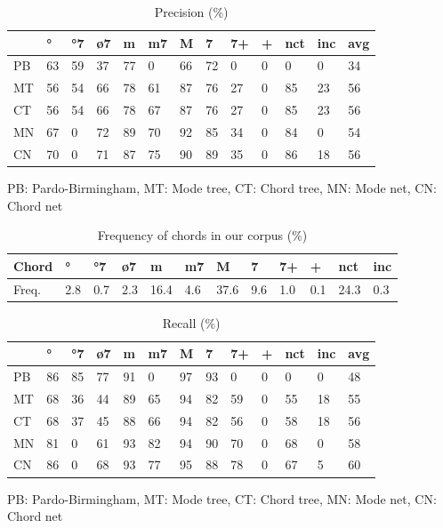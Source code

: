 \documentclass{article}
\begin{document}
\begin{table}
  \centering
  \begin{tabular}{l|p{.1cm}p{.1cm}p{.1cm}p{.1cm}p{.1cm}p{.1cm}p{.1cm}p{.1cm}p{.01cm}p{.1cm}p{.35cm}|p{.3cm}}
                 &  °& °7& ø7& m&  m7&  M&  7& 7+&+&nct&inc& avg\\
    \hline                                                     
    PB   & 63& 59& 37& 77&  0& 66& 72&  0&0&  0&  0& 34 \\
    MT   & 56& 54& 66& 78& 61& 87& 76& 27&0& 85& 23& 56 \\
    CT   & 56& 54& 66& 78& 67& 87& 76& 27&0& 85& 23& 56 \\
    MN   & 67&  0& 72& 89& 70& 92& 85& 34&0& 84&  0& 54 \\
    CN   & 70&  0& 71& 87& 75& 90& 89& 35&0& 86& 18& 56 \\

  \end{tabular}

\medskip

PB: Pardo-Birmingham, MT: Mode tree, CT: Chord tree, MN: Mode net,
CN: Chord net

  \caption{Precision (\%)}
  \label{tab:precision}
\end{table}

\begin{table}
  \centering
  \begin{tabular}{l|p{.12cm}p{.12cm}p{.12cm}p{.3cm}p{.12cm}p{.3cm}p{.12cm}p{.12cm}p{.12cm}p{.3cm}p{.25cm}}
    Chord        &  °& °7& ø7&   m& m7&   M&  7& 7+&+  & nct&inc \\
    \hline                                                     
    Freq.    &2.8&0.7&2.3&16.4&4.6&37.6&9.6&1.0&0.1&24.3&0.3  \\
  \end{tabular}
  \caption{Frequency of chords in our corpus (\%)}
  \label{tab:frequency}
\end{table}


\begin{table}
  \centering
  \begin{tabular}{l|p{.1cm}p{.1cm}p{.1cm}p{.1cm}p{.1cm}p{.1cm}p{.1cm}p{.1cm}p{.01cm}p{.1cm}p{.35cm}|p{.3cm}}
                 &  °& °7& ø7& m&  m7&  M&  7& 7+&+&nct& inc& avg\\
    \hline
    PB   & 86& 85& 77& 91&  0& 97& 93&  0&  0&  0&  0& 48 \\
    MT   & 68& 36& 44& 89& 65& 94& 82& 59&  0& 55& 18& 55 \\
    CT   & 68& 37& 45& 88& 66& 94& 82& 56&  0& 58& 18& 56 \\
    MN   & 81&  0& 61& 93& 82& 94& 90& 70&  0& 68&  0& 58 \\
    CN   & 86&  0& 68& 93& 77& 95& 88& 78&  0& 67&  5& 60 \\
  \end{tabular}

\medskip

PB: Pardo-Birmingham, MT: Mode tree, CT: Chord tree, MN: Mode net,
CN: Chord net

  \caption{Recall (\%)}
  \label{tab:recall}
\end{table}
\end{document}
